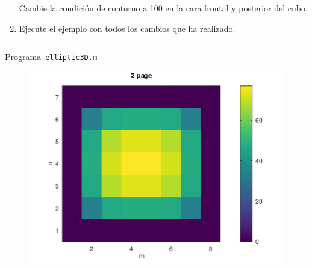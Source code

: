 \begin{problem}
\begin{enumerate}
            Cambie la condición de contorno a 100 en la cara frontal
            y posterior del cubo.

            \begin{solution}
                  \noQED
            \end{solution}

      \item

            Ejecute el ejemplo con todos los cambios que ha realizado.

            \begin{solution}
                  \noQED
            \end{solution}
\end{enumerate}
\end{problem}

\begin{listing}[ht!]
      \tiny
      \centering
      \inputminted[frame=single,framesep=10pt,linenos,firstline=1,lastline=38,highlightlines={14,15}]{octave}{../examples/octave/elliptic3D.m}
      \caption{Programa~\texttt{elliptic3D.m}}
      \label{code:elliptic3D.m}
\end{listing}

\begin{figure}[ht!]
      \centering
      \includegraphics[width=.6\paperwidth]{../examples/octave/elliptic3D.pdf}
\end{figure}
